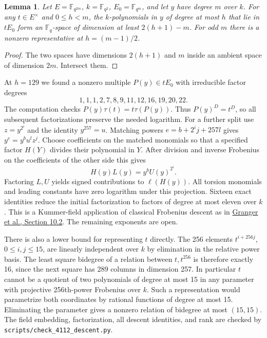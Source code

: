 \documentclass[11pt]{article}
\newtheorem{lemma}[theorem]{Lemma}
\begin{document}
\begin{lemma}
Let \(E=\mathbb F_{q^{2m}}\), \(k=\mathbb F_{q^2}\),
\(E_0=\mathbb F_{q^m}\), and let \(y\) have degree \(m\) over \(k\).
For any \(t\in E^\times\) and \(0\le h<m\), the \(k\)-polynomials
in \(y\) of degree at most \(h\) that lie in \(tE_0\) form an
\(\mathbb F_q\)-space of dimension at least \(2(h+1)-m\).
For odd \(m\) there is a nonzero representative at \(h=(m-1)/2\).
\end{lemma}
\begin{proof}
The two spaces have dimensions \(2(h+1)\) and \(m\) inside an
ambient space of dimension \(2m\). Intersect them.
\end{proof}

At \(h=129\) we found a nonzero multiple \(P(y)\in tE_0\) with
irreducible factor degrees
\[
        1,1,1,2,7,8,9,11,12,16,19,20,22 .
\]
The computation checks \(P(y)\tau(t)=t\tau(P(y))\).
Thus \(P(y)^D=t^D\), so all subsequent factorizations preserve
the needed logarithm. For a further split use \(z=y^{2^i}\) and
the identity \(y^{257}=u\). Matching powers \(e=b+2^i j+257l\)
gives \(y^e=y^b u^l z^j\). Choose coefficients on the matched
monomials so that a specified factor \(H(Y)\) divides their
polynomial in \(Y\). After division and inverse Frobenius on
the coefficients of the other side this gives
\[
             H(y)L(y)=y^b U(y)^{2^i}.
\]
Factoring \(L,U\) yields signed contributions to \(\ell(H(y))\).
All torsion monomials and leading constants have zero logarithm
under this projection. Sixteen exact identities reduce the initial
factorization to factors of degree at most eleven over \(k\).
This is a Kummer-field application of classical Frobenius descent
as in \href{https://arxiv.org/abs/2008.02717}
{Granger et al., Section 10.2}. The remaining exponents are open.

There is also a lower bound for representing \(t\) directly.
The 256 elements \(t^{i+256j}\), \(0\le i,j\le15\), are linearly
independent over \(k\) by elimination in the relative power basis.
The least square bidegree of a relation between \(t,t^{256}\) is
therefore exactly 16, since the next square has 289 columns in
dimension 257. In particular \(t\) cannot be a quotient of two
polynomials of degree at most 15 in any parameter with projective
256th-power Frobenius over \(k\). Such a representation would
parametrize both coordinates by rational functions of degree at
most 15. Eliminating the parameter gives a nonzero relation of
bidegree at most \((15,15)\).
The field embedding, factorization, all descent identities, and rank
are checked by \nolinkurl{scripts/check_4112_descent.py}.
\end{document}
